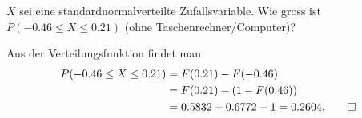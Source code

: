 $X$ sei eine standardnormalverteilte Zufallsvariable. Wie gross
ist $P(-0.46\le X\le 0.21)$ (ohne Taschenrechner/Computer)?


\begin{loesung}
Aus der Verteilungsfunktion findet man
\begin{align*}
P(-0.46\le X\le 0.21)
&=F(0.21)-F(-0.46)
\\
&=F(0.21)-(1-F(0.46))
\\
&=0.5832+0.6772-1=0.2604.
\qedhere
\end{align*}
\end{loesung}

